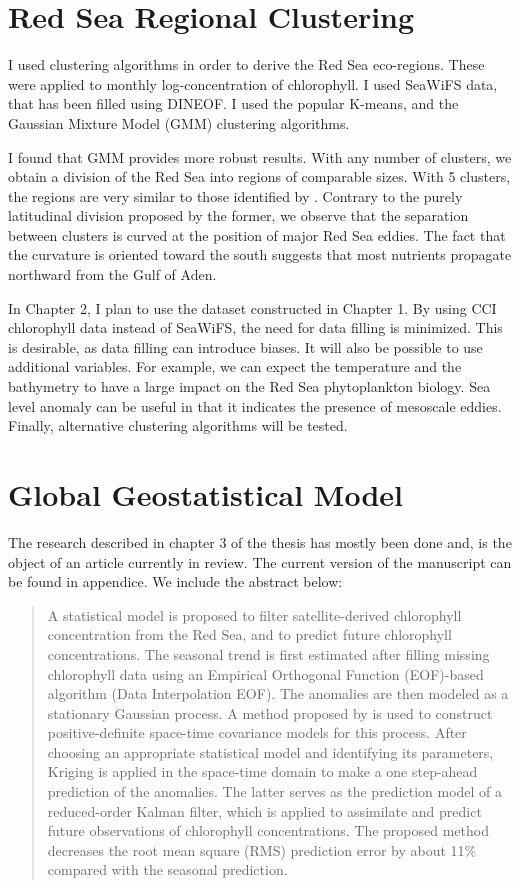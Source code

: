 \section{Red Sea Regional Clustering}

I used clustering algorithms in order to derive the Red Sea eco-regions. These
were applied to monthly log-concentration of chlorophyll. I used SeaWiFS data,
that has been filled using DINEOF. I used the popular K-means, and the Gaussian
Mixture Model (GMM) clustering algorithms.

I found that GMM provides more robust results. With any number of clusters, we
obtain a division of the Red Sea into regions of comparable sizes.  With 5
clusters, the regions are very similar to those identified by
\citet{Raitsos2013}.  Contrary to the purely latitudinal division proposed by
the former, we observe that the separation between clusters is curved at the
position of major Red Sea eddies.  The fact that the curvature is oriented
toward the south suggests that most nutrients propagate northward from the Gulf
of Aden.

In Chapter 2, I plan to use the dataset constructed in Chapter 1.  By using CCI
chlorophyll data instead of SeaWiFS, the need for data filling is minimized.
This is desirable, as data filling can introduce biases. It will also be
possible to use additional variables. For example, we can expect the
temperature and the bathymetry to have a large impact on the Red Sea
phytoplankton biology. Sea level anomaly can be useful in that it indicates the
presence of mesoscale eddies. Finally, alternative clustering algorithms will
be tested.

\section{Global Geostatistical Model}

The research described in chapter 3 of the thesis has mostly been
done and, is the object of an article currently in review. The current version
of the manuscript can be found in appendice. We include the abstract below:

\begin{quotation}
A statistical model is proposed to filter satellite-derived chlorophyll
concentration from the Red Sea, and to predict future chlorophyll
concentrations. The seasonal trend is first estimated after filling missing
chlorophyll data using an Empirical Orthogonal Function (EOF)-based algorithm
(Data Interpolation EOF). The anomalies are then modeled as a stationary
Gaussian process. A method proposed by \citet{Gneiting2002} is used to
construct positive-definite space-time covariance models for this process.
After choosing an appropriate statistical model and identifying its parameters,
Kriging is applied in the space-time domain to make a one step-ahead prediction
of the anomalies. The latter serves as the prediction model of a reduced-order
Kalman filter, which is applied to assimilate and predict future observations
of chlorophyll concentrations. The proposed method decreases the root mean
square (RMS) prediction error by about 11\% compared with the seasonal
prediction.
\end{quotation}

